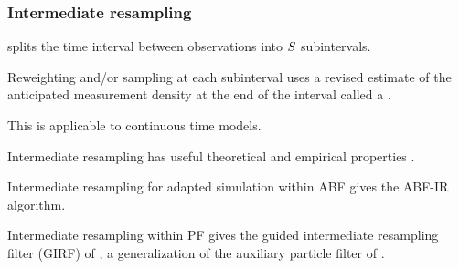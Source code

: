 \documentclass{beamer}
\begin{document}
\begin{frame}
\frametitle{Intermediate resampling}



\begin{myitemize}
\item {} splits the time interval between observations into $S$ subintervals.

\vspace{2mm}

\item Reweighting and/or sampling at each subinterval uses a revised estimate of the anticipated measurement density at the end of the interval called a .

\vspace{2mm}

\item This is applicable to continuous time models.

\vspace{2mm}

\item Intermediate resampling has useful theoretical and empirical properties \citep{delmoral15,park20}.

\vspace{2mm}

\item Intermediate resampling for adapted simulation within ABF gives the ABF-IR algorithm.

\vspace{2mm}

\item Intermediate resampling within PF gives the guided intermediate resampling filter (GIRF) of \citet{park20}, a generalization of the auxiliary particle filter of \citet{pitt99}.
  
\end{myitemize}

\end{frame}
\end{document}
